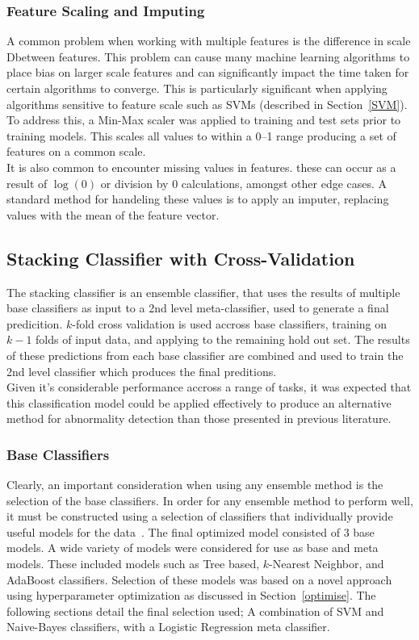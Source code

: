\documentclass[titlepage, 12pt]{scrartcl} \usepackage{enumitem}
\begin{document}
\subsubsection{Feature Scaling and Imputing}
A common problem when working with multiple features is the difference in scale
Dbetween features. This problem can cause many machine learning algorithms to place
bias on larger scale features and can significantly impact the time taken for
certain algorithms to converge. This is particularly significant when applying
algorithms sensitive to feature scale such as SVMs (described in
Section~\ref{SVM}). To address this, a Min-Max scaler was applied
to training and test sets prior to training models. This scales all values to within a
0--1 range producing a set of features on a common scale.\\
It is also common to encounter missing values in features. these can occur as a
result of $\log(0)$ or division by 0 calculations, amongst other edge cases. A
standard method for handeling these values is to apply an imputer, replacing
values with the mean of the feature vector.~\parencite{VanderPlas2017}

\subsection{Stacking Classifier with Cross-Validation}\label{class}
The stacking classifier is an ensemble classifier, that uses the results of
multiple base classifiers as input to a 2nd level meta-classifier, used to
generate a final predicition. $k$-fold cross validation is used accross base
classifiers, training on $k-1$ folds of input data, and applying to the
remaining hold out set. The results of these predictions from each base
classifier are combined and used to train the 2nd level classifier which
produces the final preditions.\\
Given it's considerable performance accross a range of tasks, it was expected
that this classification model could be applied effectively to produce an
alternative method for abnormality detection than those presented in previous
literature.

\subsubsection{Base Classifiers}
Clearly, an important consideration when using any ensemble method is the
selection of the base classifiers. In order for any ensemble method to perform
well, it must be constructed using a selection of classifiers that individually
provide useful models for the data~\parencite[p.484]{Tobergte2013a}.  The final
optimized model consisted of 3 base models. A wide variety of models were
considered for use as base and meta models. These included models such as Tree
based, $k$-Nearest Neighbor, and AdaBoost classifiers. Selection of these
models was based on a novel approach using hyperparameter optimization as
discussed in Section~\ref{optimise}. The following sections detail the final
selection used; A combination of SVM and Naive-Bayes classifiers, with a
Logistic Regression meta classifier.
\end{document}
